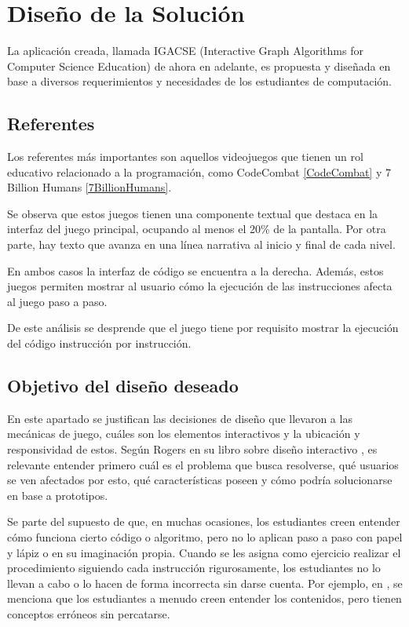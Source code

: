 \chapter{Diseño de la Solución}

La aplicación creada, llamada IGACSE (Interactive Graph Algorithms for Computer Science Education) de ahora en adelante, es propuesta y diseñada en base a diversos requerimientos y necesidades de los estudiantes de computación.

\section{Referentes}

Los referentes más importantes son aquellos videojuegos que tienen un rol educativo relacionado a la programación, como CodeCombat \ref{CodeCombat} y 7 Billion Humans \ref{7BillionHumans}.

Se observa que estos juegos tienen una componente textual que destaca en la interfaz del juego principal, ocupando al menos el 20\% de la pantalla. Por otra parte, hay texto que avanza en una línea narrativa al inicio y final de cada nivel.

En ambos casos la interfaz de código se encuentra a la derecha. Además, estos juegos permiten mostrar al usuario cómo la ejecución de las instrucciones afecta al juego paso a paso.

De este análisis se desprende que el juego tiene por requisito mostrar la ejecución del código instrucción por instrucción.

\section{Objetivo del diseño deseado}

En este apartado se justifican las decisiones de diseño que llevaron a las mecánicas de juego, cuáles son los elementos interactivos y la ubicación y responsividad de estos. Según Rogers en su libro sobre diseño interactivo \cite{Rogers2002InteractionDesign}, es relevante entender primero cuál es el problema que busca resolverse, qué usuarios se ven afectados por esto, qué características poseen y cómo podría solucionarse en base a prototipos.

Se parte del supuesto de que, en muchas ocasiones, los estudiantes creen entender cómo funciona cierto código o algoritmo, pero no lo aplican paso a paso con papel y lápiz o en su imaginación propia. Cuando se les asigna como ejercicio realizar el procedimiento siguiendo cada instrucción rigurosamente, los estudiantes no lo llevan a cabo o lo hacen de forma incorrecta sin darse cuenta. Por ejemplo, en \cite{IdentifyingStudentDifficultiesDataStructures}, se menciona que los estudiantes a menudo creen entender los contenidos, pero tienen conceptos erróneos sin percatarse.

